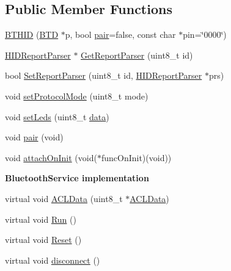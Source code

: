 \subsection*{\-Public \-Member \-Functions}
\begin{DoxyCompactItemize}
\item 
\hyperlink{class_b_t_h_i_d_a5ee874513852b83d6a04b991ab892f54}{\-B\-T\-H\-I\-D} (\hyperlink{class_b_t_d}{\-B\-T\-D} $\ast$p, bool \hyperlink{class_b_t_h_i_d_afb19720b65cda69d910416c7a689dd45}{pair}=false, const char $\ast$pin=\char`\"{}0000\char`\"{})
\item 
\hyperlink{class_h_i_d_report_parser}{\-H\-I\-D\-Report\-Parser} $\ast$ \hyperlink{class_b_t_h_i_d_ade1924514bc9c9cd71f54a1f37529575}{\-Get\-Report\-Parser} (uint8\-\_\-t id)
\item 
bool \hyperlink{class_b_t_h_i_d_a0e903f0b5040f3561e5de6c4431027b1}{\-Set\-Report\-Parser} (uint8\-\_\-t id, \hyperlink{class_h_i_d_report_parser}{\-H\-I\-D\-Report\-Parser} $\ast$prs)
\item 
void \hyperlink{class_b_t_h_i_d_afceaafc89581441da40b141170b98595}{set\-Protocol\-Mode} (uint8\-\_\-t mode)
\item 
void \hyperlink{class_b_t_h_i_d_ae222e33ac617620c4cab5c1b23b89310}{set\-Leds} (uint8\-\_\-t \hyperlink{masstorage_8h_afb87d045bbf32b236fc425efe02bdc7b}{data})
\item 
void \hyperlink{class_b_t_h_i_d_afb19720b65cda69d910416c7a689dd45}{pair} (void)
\item 
void \hyperlink{class_b_t_h_i_d_ac2d67e173774e344bca86fbd0ed5a10c}{attach\-On\-Init} (void($\ast$func\-On\-Init)(void))
\end{DoxyCompactItemize}
\begin{Indent}{\bf \-Bluetooth\-Service implementation}\par
\begin{DoxyCompactItemize}
\item 
virtual void \hyperlink{class_b_t_h_i_d_a84eb1b910027f2d78741f65225c14e54}{\-A\-C\-L\-Data} (uint8\-\_\-t $\ast$\hyperlink{class_b_t_h_i_d_a84eb1b910027f2d78741f65225c14e54}{\-A\-C\-L\-Data})
\item 
virtual void \hyperlink{class_b_t_h_i_d_a938eab04e406a29cc9324dad3ccb52cc}{\-Run} ()
\item 
virtual void \hyperlink{class_b_t_h_i_d_af4c58b81414a037910dd6fb78f97b96e}{\-Reset} ()
\item 
virtual void \hyperlink{class_b_t_h_i_d_ae1ee62d7b9951ec7960f122c9fc2d2d0}{disconnect} ()
\end{DoxyCompactItemize}
\end{Indent}

